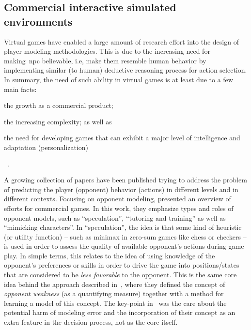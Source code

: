 
\subsection{Commercial interactive simulated environments}

Virtual games have enabled a large amount of research effort into the design of player modeling methodologies. This is due to the increasing need for making~\gls{npc} believable, i.e, make them resemble human behavior by implementing similar (to human) deductive reasoning process for action selection. In summary, the need of such ability in virtual games is at least due to a few main facts: \begin{inparaenum}\item the growth as a commercial product; \item the increasing complexity; as well as \item the need for developing games that can exhibit a major level of intelligence and adaptation (personalization)\end{inparaenum}~\citep{bakkes_personalised_2012}. 

A growing collection of papers have been published trying to address the problem of predicting the player (opponent) behavior (actions) in different levels and in different contexts. Focusing on opponent modeling, \cite{herik_opponent_2005} presented an overview of efforts for commercial games. In this work, they emphasize types and roles of opponent models, such as ``speculation'', ``tutoring and training'' as well as ``mimicking characters''. In ``speculation'', the idea is that some kind of heuristic (or utility function) -- such as minimax in zero-sum games like chess or checkers -- is used in order to assess the quality of available opponent's actions during game-play. In simple terms, this relates to the idea of using knowledge of the opponent's preferences or skills in order to drive the game into positions/states that are considered to be \textit{less favorable} to the opponent. This is the same core idea behind the approach described in~\cite{markovitch_learning_2005}, where they defined the concept of \textit{opponent weakness} (as a quantifying measure) together with a method for learning a model of this concept. The key-point in~\cite{markovitch_learning_2005} was the care about the potential harm of modeling error and the incorporation of their concept as an extra feature in the decision process, not as the core itself.

